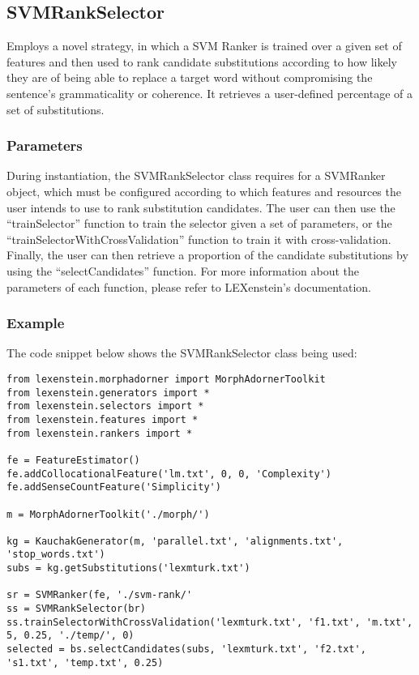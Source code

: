 \subsection{SVMRankSelector}

Employs a novel strategy, in which a SVM Ranker is trained over a given set of features and then used to rank candidate substitutions according to how likely they are of being able to replace a target word without compromising the sentence's grammaticality or coherence. It retrieves a user-defined percentage of a set of substitutions.

\subsubsection{Parameters}

During instantiation, the SVMRankSelector class requires for a SVMRanker object, which must be configured according to which features and resources the user intends to use to rank substitution candidates. The user can then use the ``trainSelector'' function to train the selector given a set of parameters, or the ``trainSelectorWithCrossValidation'' function to train it with cross-validation. Finally, the user can then retrieve a proportion of the candidate substitutions by using the ``selectCandidates'' function. For more information about the parameters of each function, please refer to LEXenstein's documentation.

\subsubsection{Example}

The code snippet below shows the SVMRankSelector class being used:

\begin{lstlisting}
from lexenstein.morphadorner import MorphAdornerToolkit
from lexenstein.generators import *
from lexenstein.selectors import *
from lexenstein.features import *
from lexenstein.rankers import *

fe = FeatureEstimator()
fe.addCollocationalFeature('lm.txt', 0, 0, 'Complexity')
fe.addSenseCountFeature('Simplicity')

m = MorphAdornerToolkit('./morph/')

kg = KauchakGenerator(m, 'parallel.txt', 'alignments.txt', 'stop_words.txt')
subs = kg.getSubstitutions('lexmturk.txt')

sr = SVMRanker(fe, './svm-rank/'
ss = SVMRankSelector(br)
ss.trainSelectorWithCrossValidation('lexmturk.txt', 'f1.txt', 'm.txt', 5, 0.25, './temp/', 0)
selected = bs.selectCandidates(subs, 'lexmturk.txt', 'f2.txt', 's1.txt', 'temp.txt', 0.25)
\end{lstlisting}










